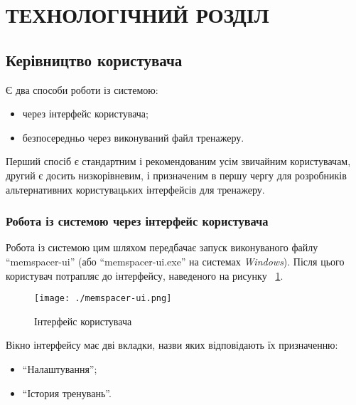 \section{ТЕХНОЛОГІЧНИЙ РОЗДІЛ}
\subsection{Керівництво користувача}
Є два способи роботи із системою:
\begin{itemize}
  \item через інтерфейс користувача;
  \item безпосередньо через виконуваний файл тренажеру.
\end{itemize}

Перший спосіб є стандартним і рекомендованим усім звичайним користувачам, другий є досить низкорівневим, і призначеним в першу чергу для розробників альтернативних користувацьких інтерфейсів для тренажеру.
\subsubsection{Робота із системою через інтерфейс користувача}
Робота із системою цим шляхом передбачає запуск виконуваного файлу ``memspacer-ui'' (або ``memspacer-ui.exe'' на системах \emph{Windows}). Після цього користувач потрапляє до інтерфейсу, наведеного на рисунку ~\ref{fig:memspacer-ui}.
\begin{figure}[here]
  \centering\texttt{[image: ./memspacer-ui.png]}
  \caption{Інтерфейс користувача}
  \label{fig:memspacer-ui}
\end{figure}

Вікно інтерфейсу має дві вкладки, назви яких відповідають їх призначенню:
\begin{itemize}
  \item ``Налаштування'';
  \item ``Істория тренувань''.
\end{itemize}

